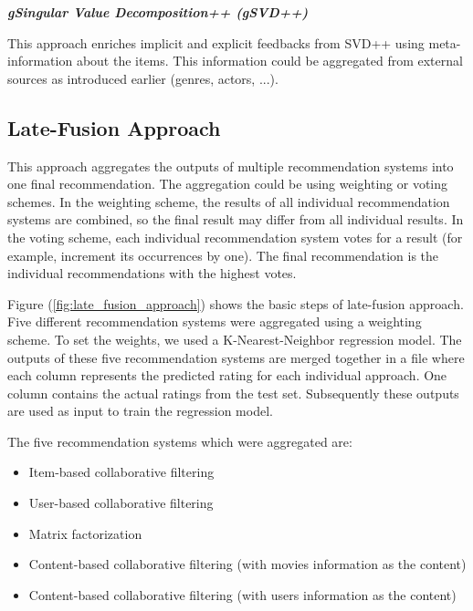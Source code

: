 \documentclass{sigish}
\begin{document}
\textbf{\emph{gSingular Value Decomposition++ (gSVD++) }}

This approach enriches implicit and explicit feedbacks from SVD++ using meta-information about the items. This information could be aggregated from external sources as introduced earlier (genres, actors, ...).

\subsection{Late-Fusion Approach}

This approach aggregates the outputs of multiple recommendation systems into one final recommendation. The aggregation could be using weighting or voting schemes. In the weighting scheme, the results of all individual recommendation systems are combined, so the final result may differ from all individual results. In the voting scheme, each individual recommendation system votes for a result (for example, increment its occurrences by one). The final recommendation is the individual recommendations with the highest votes.

Figure (\ref{fig:late_fusion_approach}) shows the basic steps of late-fusion approach. Five different recommendation systems were aggregated using a weighting scheme. To set the weights, we used a K-Nearest-Neighbor regression model. The outputs of these five recommendation systems are merged together in a file where each column represents the predicted rating for each individual approach. One column contains the actual ratings from the test set. Subsequently these outputs are used as input to train the regression model. 

The five recommendation systems which were aggregated are:
\begin{itemize}
	\item Item-based collaborative filtering
	\item User-based collaborative filtering
	\item Matrix factorization
	\item Content-based collaborative filtering (with movies information as the content)
	\item Content-based collaborative filtering (with users information as the content)
\end{itemize}
\end{document}
